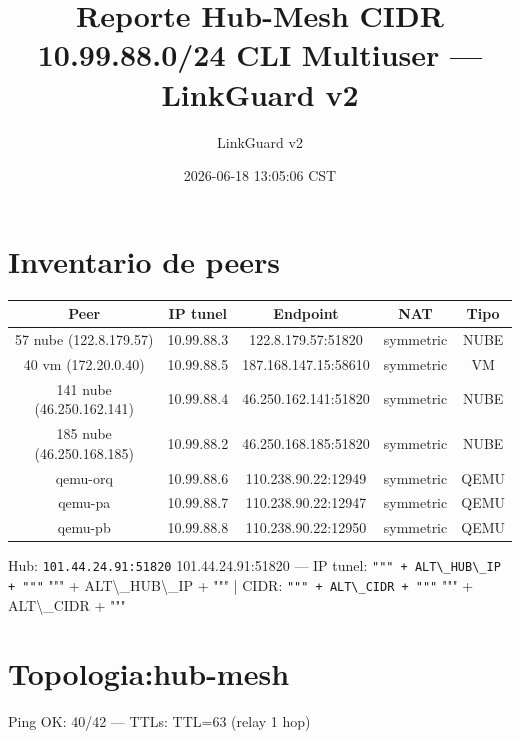 \documentclass[11pt,a4paper]{article}
\title{Reporte Hub-Mesh CIDR 10.99.88.0/24 CLI Multiuser — LinkGuard v2}
\author{LinkGuard v2}
\date{2026-06-18 13:05:06 CST}
\begin{document}
\maketitle

\section{Inventario de peers}
\begin{longtable}{|c|c|c|c|c|}
\hline
Peer & IP tunel & Endpoint & NAT & Tipo \\ \hline
57 nube (122.8.179.57) & 10.99.88.3 & 122.8.179.57:51820 & symmetric & NUBE \\ \hline
40 vm (172.20.0.40) & 10.99.88.5 & 187.168.147.15:58610 & symmetric & VM \\ \hline
141 nube (46.250.162.141) & 10.99.88.4 & 46.250.162.141:51820 & symmetric & NUBE \\ \hline
185 nube (46.250.168.185) & 10.99.88.2 & 46.250.168.185:51820 & symmetric & NUBE \\ \hline
qemu-orq & 10.99.88.6 & 110.238.90.22:12949 & symmetric & QEMU \\ \hline
qemu-pa & 10.99.88.7 & 110.238.90.22:12947 & symmetric & QEMU \\ \hline
qemu-pb & 10.99.88.8 & 110.238.90.22:12950 & symmetric & QEMU \\ \hline
\end{longtable}

Hub:  \texttt{101.44.24.91:51820} 101.44.24.91:51820  — IP tunel:  \texttt{""" + ALT\textbackslash{}_HUB\textbackslash{}_IP + """} """ + ALT\textbackslash{}_HUB\textbackslash{}_IP + """  | CIDR:  \texttt{""" + ALT\textbackslash{}_CIDR + """} """ + ALT\textbackslash{}_CIDR + """\\

\section{Topologia:hub-mesh}
Ping OK: 40/42 — TTLs: TTL=63 (relay 1 hop)\\
\end{document}
